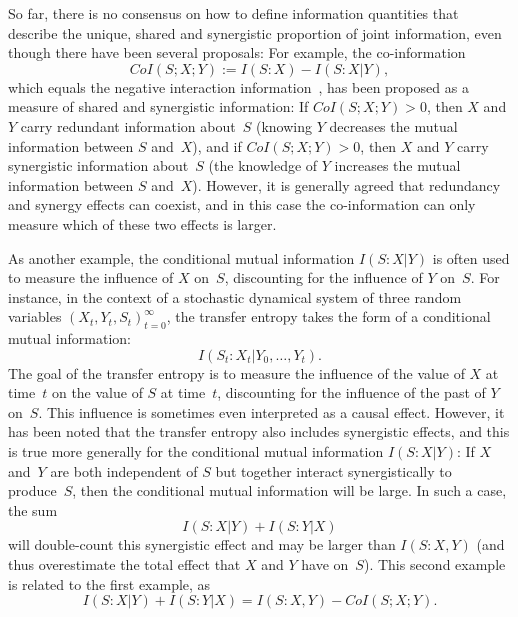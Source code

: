 \documentclass{article}
\begin{document}
So far, there is no consensus on how to define information quantities that describe the unique, shared and synergistic
proportion of joint information, even though there have been several proposals: For example, the
co-information~\cite{Bell2003:Coinformation}
\begin{equation*}
  CoI(S;X;Y) := I(S:X) - I(S:X|Y),
\end{equation*}
which equals the negative interaction information~\cite{McGill54:interaction-information}, has been proposed as a
measure of shared and synergistic information: If $CoI(S;X;Y)>0$, then $X$ and $Y$ carry redundant information about~$S$
(knowing $Y$ decreases the mutual information between $S$ and~$X$), and if $CoI(S;X;Y)>0$, then $X$ and $Y$ carry
synergistic information about~$S$ (the knowledge of $Y$ increases the mutual information between $S$ and~$X$).  However,
it is generally agreed that redundancy and synergy effects can coexist, and in this case the co-information can only
measure which of these two effects is larger.

As another example, the conditional mutual information $I(S:X|Y)$ is often used to measure the influence of $X$ on~$S$,
discounting for the influence of $Y$ on~$S$.  For instance, in the context of a stochastic dynamical system of three
random variables $(X_{t},Y_{t},S_{t})_{t=0}^{\infty}$, the transfer entropy takes the form of a conditional mutual
information:
\begin{equation*}
  I(S_{t}:X_{t}|Y_{0},\dots,Y_{t}).
\end{equation*}
The goal of the transfer entropy is to measure the influence of the value of $X$ at time~$t$ on the value of $S$ at
time~$t$, discounting for the influence of the past of $Y$ on~$S$.  This influence is sometimes even interpreted as a
causal effect.  However, it has been noted that the transfer entropy also includes synergistic effects, and this is true
more generally for the conditional mutual information $I(S:X|Y)$: If $X$ and~$Y$ are both independent of $S$ but
together interact synergistically to produce~$S$, then the conditional mutual information will be large.  In such a
case, the sum %
\begin{equation*}
  I(S:X|Y) + I(S:Y|X)
\end{equation*}
will double-count this synergistic effect and may be larger than $I(S:X,Y)$ (and thus overestimate the total effect that
$X$ and $Y$ have on~$S$).  This second example is related to the first example, as
\begin{equation*}
  I(S:X|Y) + I(S:Y|X)
  = I(S:X,Y) - CoI(S;X;Y).
\end{equation*}
\end{document}
